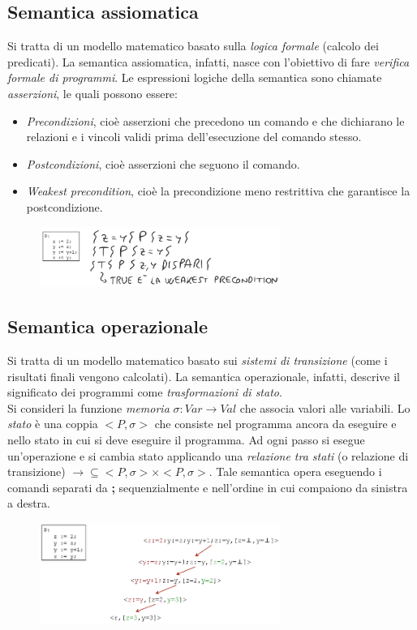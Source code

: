 \documentclass[a4paper,oneside,titlepage]{book}
\begin{document}
\subsection{Semantica assiomatica}
Si tratta di un modello matematico basato sulla \textit{logica formale} (calcolo dei predicati). La semantica assiomatica, infatti, nasce con l'obiettivo di fare \textit{verifica formale di programmi}. Le espressioni logiche della semantica sono chiamate \textit{asserzioni}, le quali possono essere:
\begin{itemize}
	\item \textit{Precondizioni}, cioè asserzioni che precedono un comando e che dichiarano le relazioni e i vincoli validi prima dell'esecuzione del comando stesso.
	\item \textit{Postcondizioni}, cioè asserzioni che seguono il comando.
	\item \textit{Weakest precondition}, cioè la precondizione meno restrittiva che garantisce la postcondizione.
\end{itemize}
\begin{figure}[htp]
	\centering
	\includegraphics[width=0.7\textwidth, height=0.7\textheight, keepaspectratio]{assiomatica.png}
\end{figure}

\subsection{Semantica operazionale}
Si tratta di un modello matematico basato sui \textit{sistemi di transizione} (come i risultati finali vengono calcolati). La semantica operazionale, infatti, descrive il significato dei programmi come \textit{trasformazioni di stato}.
\\
Si consideri la funzione \textit{memoria} $\sigma: Var \rightarrow Val$ che associa valori alle variabili. Lo \textit{stato} è una coppia $<P,\sigma>$ che consiste nel programma ancora da eseguire e nello stato in cui si deve eseguire il programma. Ad ogni passo si esegue un'operazione e si cambia stato applicando una \textit{relazione tra stati} (o relazione di transizione) $\rightarrow \subseteq <P,\sigma> \times <P,\sigma>$. Tale semantica opera eseguendo i comandi separati da \textbf{;} sequenzialmente e nell'ordine in cui compaiono da sinistra a destra.
\begin{figure}[htp]
	\centering
	\includegraphics[width=0.7\textwidth, height=0.7\textheight, keepaspectratio]{operazionale.png}
\end{figure}
\end{document}
